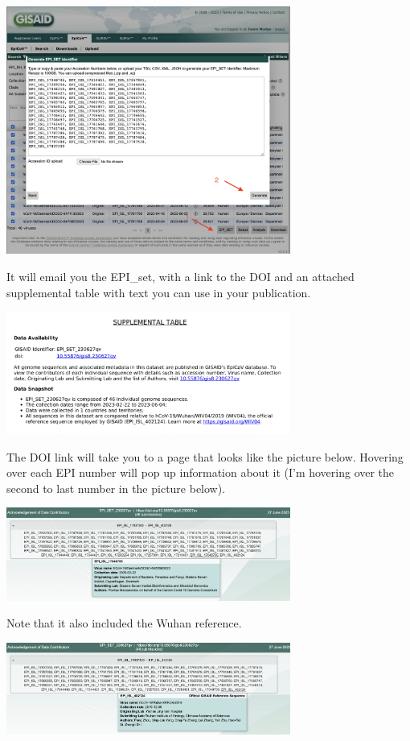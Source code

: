 \documentclass[
]{book}
\begin{document}
\includegraphics[width=0.7\textwidth,height=\textheight]{./Figures/episet.png}

It will email you the EPI\_set, with a link to the DOI and an attached supplemental table with text you can use in your publication.

\includegraphics[width=0.7\textwidth,height=\textheight]{./Figures/SuppTable.png}

The DOI link will take you to a page that looks like the picture below. Hovering over each EPI number will pop up information about it (I'm hovering over the second to last number in the picture below).

\includegraphics[width=0.7\textwidth,height=\textheight]{./Figures/AckDen.png}

Note that it also included the Wuhan reference.

\includegraphics[width=0.7\textwidth,height=\textheight]{./Figures/AckWuhan.png}
\end{document}
